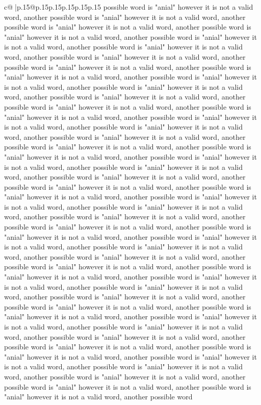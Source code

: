 \documentclass{article}
\begin{document}
{\begin{supertabular}{c@{$\;$}|p{.15\linewidth}@{}p{.15\linewidth}p{.15\linewidth}p{.15\linewidth}p{.15\linewidth}p{.15\linewidth}}
{{{possible word is "anial" however it is not a valid word, another possible word is "anial" however it is not a valid word, another possible word is "anial" however it is not a valid word, another possible word is "anial" however it is not a valid word, another possible word is "anial" however it is not a valid word, another possible word is "anial" however it is not a valid word, another possible word is "anial" however it is not a valid word, another possible word is "anial" however it is not a valid word, another possible word is "anial" however it is not a valid word, another possible word is "anial" however it is not a valid word, another possible word is "anial" however it is not a valid word, another possible word is "anial" however it is not a valid word, another possible word is "anial" however it is not a valid word, another possible word is "anial" however it is not a valid word, another possible word is "anial" however it is not a valid word, another possible word is "anial" however it is not a valid word, another possible word is "anial" however it is not a valid word, another possible word is "anial" however it is not a valid word, another possible word is "anial" however it is not a valid word, another possible word is "anial" however it is not a valid word, another possible word is "anial" however it is not a valid word, another possible word is "anial" however it is not a valid word, another possible word is "anial" however it is not a valid word, another possible word is "anial" however it is not a valid word, another possible word is "anial" however it is not a valid word, another possible word is "anial" however it is not a valid word, another possible word is "anial" however it is not a valid word, another possible word is "anial" however it is not a valid word, another possible word is "anial" however it is not a valid word, another possible word is "anial" however it is not a valid word, another possible word is "anial" however it is not a valid word, another possible word is "anial" however it is not a valid word, another possible word is "anial" however it is not a valid word, another possible word is "anial" however it is not a valid word, another possible word is "anial" however it is not a valid word, another possible word is "anial" however it is not a valid word, another possible word is "anial" however it is not a valid word, another possible word is "anial" however it is not a valid word, another possible word is "anial" however it is not a valid word, another possible word is "anial" however it is not a valid word, another possible word is "anial" however it is not a valid word, another possible word is "anial" however it is not a valid word, another possible word is "anial" however it is not a valid word, another possible word is "anial" however it is not a valid word, another possible word is "anial" however it is not a valid word, another possible word is "anial" however it is not a valid word, another possible word is "anial" however it is not a valid word, another possible word is "anial" however it is not a valid word, another possible word is "anial" however it is not a valid word, another possible word }}}
\end{supertabular}}
\end{document}
